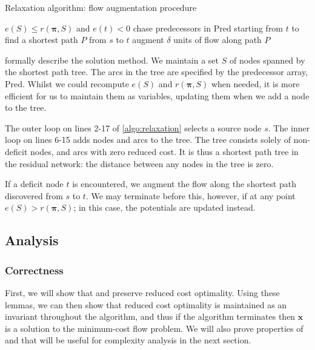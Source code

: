 \begin{algorithm}
    \caption{Relaxation algorithm: flow augmentation procedure}
    \label{algo:relaxation-augment-flow}
    \begin{algorithmic}[1]
        \Require $e(S) \leq r(\boldsymbol{\pi},S)$ and $e(t) < 0$
        \Statex
        \State chase predecessors in $\mathrm{Pred}$ starting from $t$ to find a shortest path $P$ from $s$ to $t$
        \State augment $\delta$ units of flow along path $P$
        \EndFunction
    \end{algorithmic}
\end{algorithm}

 formally describe the solution method. We maintain a set $S$ of nodes spanned by the shortest path tree. The arcs in the tree are specified by the predecessor array, $\mathrm{Pred}$. Whilst we could recompute $e(S)$ and $r(\boldsymbol{\pi},S)$ when needed, it is more efficient for us to maintain them as variables, updating them when we add a node to the tree.

The outer loop on lines 2-17 of \cref{algo:relaxation} selects a source node $s$. The inner loop on lines 6-15 adds nodes and arcs to the tree. The tree consists solely of non-deficit nodes, and arcs with zero reduced cost. It is thus a shortest path tree in the residual network: the distance between any nodes in the tree is zero\footnotemark.

If a deficit node $t$ is encountered, we augment the flow along the shortest path discovered from $s$ to $t$. We may terminate before this, however, if at any point $e(S) > r(\boldsymbol{\pi},S)$; in this case, the potentials are updated instead.

\subsection{Analysis} \label{sec:impl-relax-analysis}

\subsubsection{Correctness}

First, we will show that  and  preserve reduced cost optimality. Using these lemmas, we can then show that reduced cost optimality is maintained as an invariant throughout the algorithm, and thus if the algorithm terminates then $\mathbf{x}$ is a solution to the minimum-cost flow problem. We will also prove properties of  and  that will be useful for complexity analysis in the next section.\\

